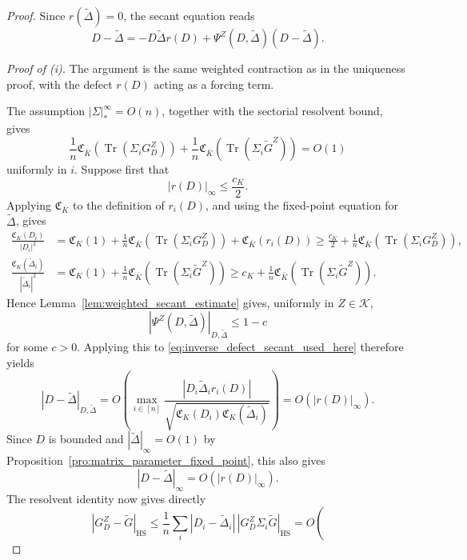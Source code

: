 \documentclass[EJP, preprint, NODS, nobera, nofontexpansion]{ejpecp}
\DeclareMathOperator{\tr}{Tr}
\DeclareMathOperator{\hs}{HS}
\begin{document}
\begin{proof}
Since \(r(\widetilde\Delta)=0\), the secant equation reads
\begin{equation}
\label{eq:inverse_defect_secant_used_here}
D-\widetilde\Delta
=
-D\widetilde\Delta r(D)
+
\Psi^Z(D,\widetilde\Delta)(D-\widetilde\Delta) .
\end{equation}

\medskip
\noindent
\emph{Proof of \textnormal{(i)}.}
The argument is the same weighted contraction as in the uniqueness proof,
with the defect \(r(D)\) acting as a forcing term.

The assumption \( |\Sigma|_*^\infty=O(n)\), together with the sectorial
resolvent bound, gives
\[
    \frac1n\mathfrak C_{\bar K}(\tr(\Sigma_iG_D^Z))+\frac1n\mathfrak C_{\bar K}(\tr(\Sigma_i\widetilde G^Z))=O(1)
\]
uniformly in \(i\).
Suppose first that
\[
    |r(D)|_\infty\leq \frac{c_K}2.
\]
Applying \(\mathfrak C_{\bar K}\) to the definition of \(r_i(D)\), and using the
fixed-point equation for \(\widetilde\Delta\), gives
\begin{align*}
\frac{\mathfrak C_K(D_i)}{|D_i|^2}
&=
\mathfrak C_K(1)+\frac1n\mathfrak C_{\bar K}(\tr(\Sigma_iG_D^Z))
+\mathfrak C_{\bar K}(r_i(D))
    \geq
\frac{c_K}2+\frac1n\mathfrak C_{\bar K}(\tr(\Sigma_iG_D^Z)),
\\
\frac{\mathfrak C_K(\widetilde\Delta_i)}
{|\widetilde\Delta_i|^2}
&=
\mathfrak C_K(1)+\frac1n\mathfrak C_{\bar K}(\tr(\Sigma_i\widetilde G^Z))
    \geq
c_K+\frac1n\mathfrak C_{\bar K}(\tr(\Sigma_i\widetilde G^Z)).
\end{align*}
Hence Lemma~\ref{lem:weighted_secant_estimate} gives, uniformly in
\(Z\in\mathcal K\),
\[
    |\Psi^Z(D,\widetilde\Delta)|_{D,\widetilde\Delta}
    \leq 1-c
\]
for some \(c>0\). Applying this to
\eqref{eq:inverse_defect_secant_used_here} therefore yields
\[
 |D-\widetilde\Delta|_{D,\widetilde\Delta}
 =O\!\left(
  \max_{i\in[n]}
  \frac{|D_i\widetilde\Delta_i r_i(D)|}
       {\sqrt{\mathfrak C_K(D_i)
                    \mathfrak C_K(\widetilde\Delta_i)}}
 \right)
 =O(|r(D)|_\infty).
\]
Since \(D\) is bounded and
\(|\widetilde\Delta|_\infty=O(1)\) by
Proposition~\ref{pro:matrix_parameter_fixed_point}, this also gives
\begin{equation}
|D-\widetilde\Delta|_\infty
=
O(|r(D)|_\infty).
\end{equation}
The resolvent identity now gives directly
\[
    |G_D^Z-\widetilde G|_{\hs}
    \leq
    \frac1n\sum_i
        |D_i-\widetilde\Delta_i|\,
        |G_D^Z\Sigma_i\widetilde G|_{\hs}
    =
    O\!\left(
\]
\end{proof}
\end{document}
